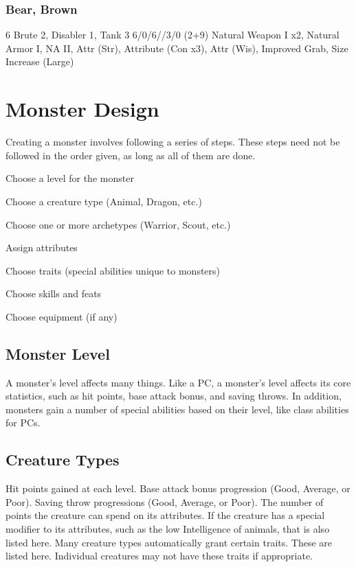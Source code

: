 \subsubsection{Bear, Brown}
 6
 Brute 2, Disabler 1, Tank 3
 6/0/6//3/0
 (2+9) Natural Weapon I x2, Natural Armor I, NA II, Attr (Str), Attribute (Con x3), Attr (Wis), Improved Grab, Size Increase (Large)

\section{Monster Design}

Creating a monster involves following a series of steps. These steps need not be followed in the order given, as long as all of them are done.

\begin{enumerate*}
    \item Choose a level for the monster
    \item Choose a creature type (Animal, Dragon, etc.)
    \item Choose one or more archetypes (Warrior, Scout, etc.)
    \item Assign attributes
    \item Choose traits (special abilities unique to monsters)
    \item Choose skills and feats
    \item Choose equipment (if any)
\end{enumerate*}

\subsection{Monster Level}
A monster's level affects many things. Like a PC, a monster's level affects its core statistics, such as hit points, base attack bonus, and saving throws. In addition, monsters gain a number of special abilities based on their level, like class abilities for PCs.

\subsection{Creature Types}
 Hit points gained at each level.
 Base attack bonus progression (Good, Average, or Poor).
 Saving throw progressions (Good, Average, or Poor).
 The number of points the creature can spend on its attributes. If the creature has a special modifier to its attributes, such as the low Intelligence of animals, that is also listed here.
 Many creature types automatically grant certain traits. These are listed here. Individual creatures may not have these traits if appropriate.

